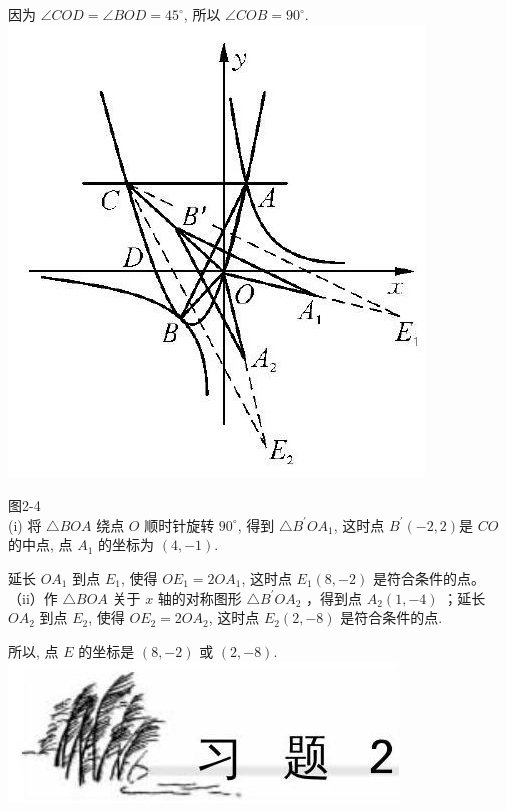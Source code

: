 \documentclass[10pt]{article}
\begin{document}
因为 $\angle C O D=\angle B O D=45^{\circ}$, 所以 $\angle C O B=90^{\circ}$.\\
\includegraphics[max width=\textwidth, center]{2024_10_30_1bf34f7aeb61f11d11d3g-039}

图2-4\\
(i) 将 $\triangle B O A$ 绕点 $O$ 顺时针旋转 $90^{\circ}$, 得到 $\triangle B^{\prime} O A_{1}$, 这时点 $B^{\prime}(-2,2)$是 $C O$ 的中点, 点 $A_{1}$ 的坐标为 $(4,-1)$.

延长 $O A_{1}$ 到点 $E_{1}$, 使得 $O E_{1}=2 O A_{1}$, 这时点 $E_{1}(8,-2)$ 是符合条件的点。\\
（ii）作 $\triangle B O A$ 关于 $x$ 轴的对称图形 $\triangle B^{\prime} O A_{2}$ ，得到点 $A_{2}(1,-4)$ ；延长 $O A_{2}$ 到点 $E_{2}$, 使得 $O E_{2}=2 O A_{2}$, 这时点 $E_{2}(2,-8)$ 是符合条件的点.

所以, 点 $E$ 的坐标是 $(8,-2)$ 或 $(2,-8)$.\\
\includegraphics[max width=\textwidth, center]{2024_10_30_1bf34f7aeb61f11d11d3g-040}
\end{document}
